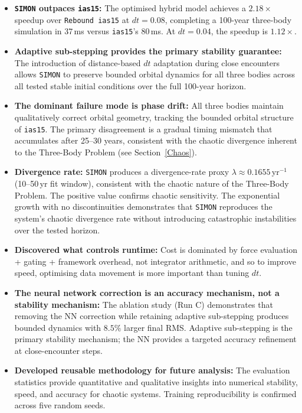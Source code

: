 \documentclass[12pt]{article}
\begin{document}
\begin{itemize}
    \item \textbf{\texttt{SIMON} outpaces \texttt{ias15}:} The optimised hybrid model achieves a $2.18\times$ speedup over \texttt{Rebound ias15} at $dt = 0.08$, completing a 100-year three-body simulation in 37\,ms versus \texttt{ias15}'s 80\,ms. At $dt = 0.04$, the speedup is $1.12\times$.
    \item \textbf{Adaptive sub-stepping provides the primary stability guarantee:} The introduction of distance-based $dt$ adaptation during close encounters allows \texttt{SIMON} to preserve bounded orbital dynamics for all three bodies across all tested stable initial conditions over the full 100-year horizon.
    \item \textbf{The dominant failure mode is phase drift:} All three bodies maintain qualitatively correct orbital geometry, tracking the bounded orbital structure of \texttt{ias15}. The primary disagreement is a gradual timing mismatch that accumulates after 25--30 years, consistent with the chaotic divergence inherent to the Three-Body Problem (see Section~\ref{Chaos}).
    \item \textbf{Divergence rate:} \texttt{SIMON} produces a divergence-rate proxy $\lambda \approx 0.1655$\,yr$^{-1}$ (10--50\,yr fit window), consistent with the chaotic nature of the Three-Body Problem. The positive value confirms chaotic sensitivity. The exponential growth with no discontinuities demonstrates that \texttt{SIMON} reproduces the system's chaotic divergence rate without introducing catastrophic instabilities over the tested horizon.
    \item \textbf{Discovered what controls runtime:} Cost is dominated by force evaluation + gating + framework overhead, not integrator arithmetic, and so to improve speed, optimising data movement is more important than tuning $dt$.
    \item \textbf{The neural network correction is an accuracy mechanism, not a stability mechanism:} The ablation study (Run C) demonstrates that removing the NN correction while retaining adaptive sub-stepping produces bounded dynamics with $8.5\%$ larger final RMS. Adaptive sub-stepping is the primary stability mechanism; the NN provides a targeted accuracy refinement at close-encounter steps.
    \item \textbf{Developed reusable methodology for future analysis:} The evaluation statistics provide quantitative and qualitative insights into numerical stability, speed, and accuracy for chaotic systems. Training reproducibility is confirmed across five random seeds.
\end{itemize}
\end{document}
